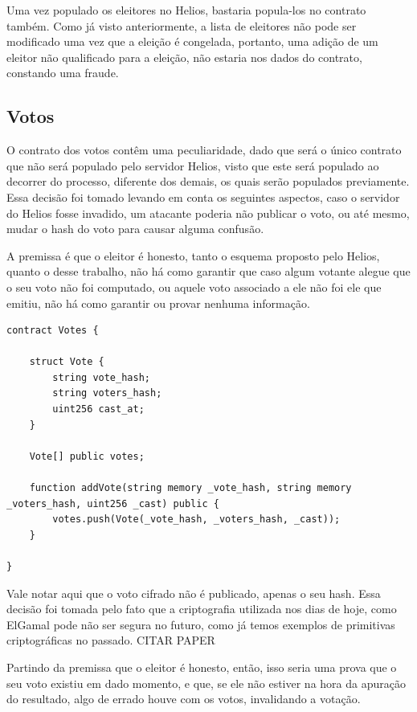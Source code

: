 \documentclass{ufsctex/ufsctex}
\begin{document}
Uma vez populado os eleitores no Helios, bastaria popula-los no contrato
também. Como já visto anteriormente, a lista de eleitores não pode ser
modificado uma vez que a eleição é congelada, portanto, uma adição de um
eleitor não qualificado para a eleição, não estaria nos dados do contrato,
constando uma fraude.

\subsection{Votos}

O contrato dos votos contêm uma peculiaridade, dado que será o único contrato
que não será populado pelo servidor Helios, visto que este será populado ao
decorrer do processo, diferente dos demais, os quais serão populados
previamente.  Essa decisão foi tomado levando em conta os seguintes aspectos,
caso o servidor do Helios fosse invadido, um atacante poderia não publicar o
voto, ou até mesmo, mudar o hash do voto para causar alguma confusão. 

A premissa é que o eleitor é honesto, tanto o esquema proposto pelo Helios,
quanto o desse trabalho, não há como garantir que caso algum votante alegue que
o seu voto não foi computado, ou aquele voto associado a ele não foi ele que
emitiu, não há como garantir ou provar nenhuma informação.

\begin{lstlisting}[language=Solidity]
contract Votes {
    
    struct Vote {
        string vote_hash;
        string voters_hash;
        uint256 cast_at;
    }
    
    Vote[] public votes;
    
    function addVote(string memory _vote_hash, string memory _voters_hash, uint256 _cast) public {
        votes.push(Vote(_vote_hash, _voters_hash, _cast));
    }
    
}
\end{lstlisting}

Vale notar aqui que o voto cifrado não é publicado, apenas o seu hash. Essa
decisão foi tomada pelo fato que a criptografia utilizada nos dias de hoje,
como ElGamal pode não ser segura no futuro, como já temos exemplos de
primitivas criptográficas no passado. CITAR PAPER

Partindo da premissa que o eleitor é honesto, então, isso seria uma prova que o
seu voto existiu em dado momento, e que, se ele não estiver na hora da apuração
do resultado, algo de errado houve com os votos, invalidando a votação.
\end{document}
